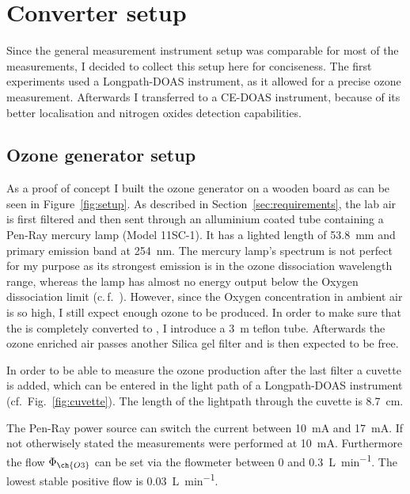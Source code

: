 \section{Converter setup}
\label{sec:setup}

Since the general measurement instrument setup was comparable for most
of the measurements, I decided to collect this setup here for
conciseness. The first experiments used a Longpath-DOAS instrument, as
it allowed for a precise ozone measurement. Afterwards I transferred
to a CE-DOAS instrument, because of its better localisation and
nitrogen oxides detection capabilities.

\subsection{Ozone generator setup}
\label{sec:ozone-setup}

As a proof of concept I built the ozone generator on a wooden board
as can be seen in Figure~\ref{fig:setup}. As described in
Section~\ref{sec:requirements}, the lab air is first filtered and then
sent through an alluminium coated tube containing a Pen-Ray mercury
lamp (Model 11SC-1). It has a lighted length of
\SI{53.8}{\milli\meter} and primary emission band at
\SI{254}{\nano\meter}. The mercury lamp's spectrum is not perfect for
my purpose as its strongest emission is in the ozone dissociation
wavelength range, whereas the lamp has almost no energy output below
the Oxygen dissociation limit (c.\,f.~\cite{lamp}). However, since the
Oxygen concentration in ambient air is so high, I still expect enough
ozone to be produced. In order to make sure that the  is completely
converted to , I introduce a \SI{3}{\meter} teflon
tube. Afterwards the ozone enriched air passes another Silica gel
filter and is then expected to be  free.

In order to be able to measure the ozone production after the last filter a
cuvette is added, which can be entered in the light path of a
Longpath-DOAS instrument (cf.\ Fig.~\ref{fig:cuvette}). The length of
the lightpath through the cuvette is \SI{8.7}{\centi\meter}. 

The Pen-Ray power source can switch the current between
\SI{10}{\milli\ampere} and \SI{17}{\milli\ampere}. If not otherwisely
stated the measurements were performed at \SI{10}{\milli\ampere}.
Furthermore the flow $\Phi_{\ch{O 3}}$ can be set via the flowmeter
between \num{0} and \SI{0.3}{\liter\per\minute}. The lowest stable
positive flow is \SI{0.03}{\liter\per\minute}.

